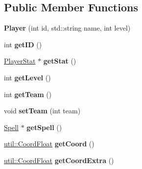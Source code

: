 \subsection*{Public Member Functions}
\begin{DoxyCompactItemize}
\item 
\hypertarget{classgame_1_1_player_a33911fb53a6cec66a019a3b6fab3077e}{{\bfseries Player} (int id, std\-::string name, int level)}\label{classgame_1_1_player_a33911fb53a6cec66a019a3b6fab3077e}

\item 
\hypertarget{classgame_1_1_player_a1bf27cae5387ad7e67f3c86bbafc558e}{int {\bfseries get\-I\-D} ()}\label{classgame_1_1_player_a1bf27cae5387ad7e67f3c86bbafc558e}

\item 
\hypertarget{classgame_1_1_player_a72973bf4f2141d30922c38687489c49a}{\hyperlink{classgame_1_1_player_stat}{Player\-Stat} $\ast$ {\bfseries get\-Stat} ()}\label{classgame_1_1_player_a72973bf4f2141d30922c38687489c49a}

\item 
\hypertarget{classgame_1_1_player_a181c79a374aa24f627e0f6c701150631}{int {\bfseries get\-Level} ()}\label{classgame_1_1_player_a181c79a374aa24f627e0f6c701150631}

\item 
\hypertarget{classgame_1_1_player_a5419f54e74b11234a38de8821119031c}{int {\bfseries get\-Team} ()}\label{classgame_1_1_player_a5419f54e74b11234a38de8821119031c}

\item 
\hypertarget{classgame_1_1_player_ae1e158374f982b3b083a71626531f6ce}{void {\bfseries set\-Team} (int team)}\label{classgame_1_1_player_ae1e158374f982b3b083a71626531f6ce}

\item 
\hypertarget{classgame_1_1_player_a469129e40ce4280d84fbdda6d922a0bb}{\hyperlink{classgame_1_1_spell}{Spell} $\ast$ {\bfseries get\-Spell} ()}\label{classgame_1_1_player_a469129e40ce4280d84fbdda6d922a0bb}

\item 
\hypertarget{classgame_1_1_player_aed8c90ec797f4436ea76c83f0371eb15}{\hyperlink{classutil_1_1_coordinates}{util\-::\-Coord\-Float} {\bfseries get\-Coord} ()}\label{classgame_1_1_player_aed8c90ec797f4436ea76c83f0371eb15}

\item 
\hypertarget{classgame_1_1_player_a53e465c2eb422011e0ce71097f78607e}{\hyperlink{classutil_1_1_coordinates}{util\-::\-Coord\-Float} {\bfseries get\-Coord\-Extra} ()}\label{classgame_1_1_player_a53e465c2eb422011e0ce71097f78607e}


\end{DoxyCompactItemize}
